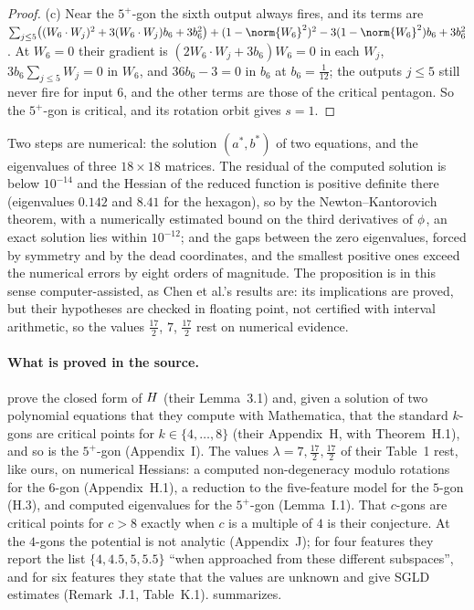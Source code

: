\begin{refsection}
\begin{proof}
(c) Near the $5^+$-gon the sixth output always fires, and its terms are $\sum_{j\le5}\bigl((W_6\cdot W_j)^2+3(W_6\cdot W_j)b_6+3b_6^2\bigr)+(1-\norm{W_6}^2)^2-3(1-\norm{W_6}^2)b_6+3b_6^2$. At $W_6=0$ their gradient is $(2W_6\cdot W_j+3b_6)W_6=0$ in each $W_j$, $3b_6\sum_{j\le5}W_j=0$ in $W_6$, and $36b_6-3=0$ in $b_6$ at $b_6=\frac1{12}$; the outputs $j\le5$ still never fire for input $6$, and the other terms are those of the critical pentagon. So the $5^+$-gon is critical, and its rotation orbit gives $s=1$.
\end{proof}

Two steps are numerical: the solution $(a^*,b^*)$ of two equations, and the eigenvalues of three $18\times18$ matrices. The residual of the computed solution is below $10^{-14}$ and the Hessian of the reduced function is positive definite there (eigenvalues $0.142$ and $8.41$ for the hexagon), so by the Newton--Kantorovich theorem, with a numerically estimated bound on the third derivatives of $\phi$, an exact solution lies within $10^{-12}$; and the gaps between the zero eigenvalues, forced by symmetry and by the dead coordinates, and the smallest positive ones exceed the numerical errors by eight orders of magnitude. The proposition is in this sense computer-assisted, as Chen et al.'s results are: its implications are proved, but their hypotheses are checked in floating point, not certified with interval arithmetic, so the values $\frac{17}2$, $7$, $\frac{17}2$ rest on numerical evidence.

\paragraph{What is proved in the source.} \textcite{ChenEtAl2023} prove the closed form of $H$ (their Lemma~3.1) and, given a solution of two polynomial equations that they compute with Mathematica, that the standard $k$-gons are critical points for $k\in\{4,\dots,8\}$ (their Appendix~H, with Theorem~H.1), and so is the $5^+$-gon (Appendix~I). The values $\lambda=7,\frac{17}2,\frac{17}2$ of their Table~1 rest, like ours, on numerical Hessians: a computed non-degeneracy modulo rotations for the $6$-gon (Appendix~H.1), a reduction to the five-feature model for the $5$-gon (H.3), and computed eigenvalues for the $5^+$-gon (Lemma~I.1). That $c$-gons are critical points for $c>8$ exactly when $c$ is a multiple of $4$ is their conjecture. At the $4$-gons the potential is not analytic (Appendix~J); for four features they report the list $\{4,4.5,5,5.5\}$ ``when approached from these different subspaces'', and for six features they state that the values are unknown and give SGLD estimates (Remark~J.1, Table~K.1).  summarizes.


\end{refsection}
